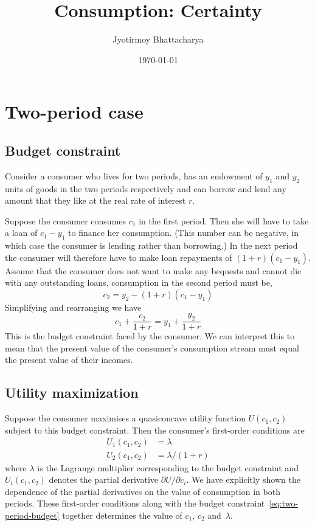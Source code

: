 \documentclass[12pt,reqno]{amsart}
\title{Consumption: Certainty}
\author{Jyotirmoy Bhattacharya}
\date{\today}
\begin{document}
\maketitle
\section{Two-period case}
\subsection{Budget constraint}
Consider a consumer who lives for two periods, has an endowment of
$y_1$ and $y_2$ units of goods in the two periods respectively and can
borrow and lend any amount that they like at the real rate of interest
$r$. 

Suppose the consumer consumes $c_1$ in the
first period. Then she will have to take a loan of $c_1-y_1$ to
finance her consumption. (This number can be negative, in which case
the consumer is lending rather than borrowing.) In the next period the
consumer will therefore have to make loan repayments of
$(1+r)(c_1-y_1)$. Assume that the consumer does not want to make any
bequests and cannot die with any outstanding loans, consumption in the
second period must be,
\[c_2=y_2-(1+r)(c_1-y_1)\]
Simplifying and rearranging we have
\begin{equation}\label{eq:two-period-budget}
c_1+\frac{c_2}{1+r}=y_1+\frac{y_2}{1+r}
\end{equation}
This is the budget constraint faced by the consumer. We can interpret
this to mean that the present value of the consumer's consumption
stream must equal the present value of their incomes.

\subsection{Utility maximization}
Suppose the consumer maximises a quasiconcave utility function
$U(c_1,c_2)$ subject to this budget constraint. Then the consumer's
first-order conditions are
\begin{align}
U_1(c_1,c_2)&=\lambda\\
U_2(c_1,c_2)&=\lambda/(1+r)
\end{align}
where $\lambda$ is the Lagrange multiplier corresponding to the budget
constraint and $U_i(c_1,c_2)$ denotes the partial derivative $\partial
U/\partial c_i$. We have explicitly shown the dependence of the
partial derivatives on the value of consumption in both periods. These
first-order conditions along with the budget
constraint~\eqref{eq:two-period-budget} together determines the value
of $c_1$, $c_2$ and~$\lambda$.
\end{document}
